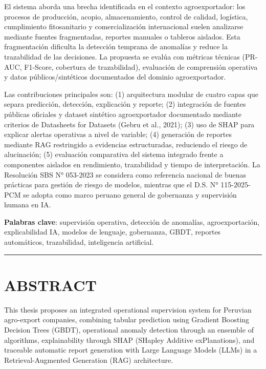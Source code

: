 El sistema aborda una brecha identificada en el contexto agroexportador:
los procesos de producción, acopio, almacenamiento, control de calidad,
logística, cumplimiento fitosanitario y comercialización internacional
suelen analizarse mediante fuentes fragmentadas, reportes manuales o
tableros aislados. Esta fragmentación dificulta la detección temprana de
anomalías y reduce la trazabilidad de las decisiones. La propuesta se
evalúa con métricas técnicas (PR-AUC, F1-Score, cobertura de
trazabilidad), evaluación de comprensión operativa y datos
públicos/sintéticos documentados del dominio agroexportador.

Las contribuciones principales son: (1) arquitectura modular de cuatro
capas que separa predicción, detección, explicación y reporte; (2)
integración de fuentes públicas oficiales y dataset sintético
agroexportador documentado mediante criterios de Datasheets for Datasets
(Gebru et al., 2021); (3) uso de SHAP para explicar alertas operativas a
nivel de variable; (4) generación de reportes mediante RAG restringido a
evidencias estructuradas, reduciendo el riesgo de alucinación; (5)
evaluación comparativa del sistema integrado frente a componentes
aislados en rendimiento, trazabilidad y tiempo de interpretación. La
Resolución SBS N° 053-2023 se considera como referencia nacional de
buenas prácticas para gestión de riesgo de modelos, mientras que el D.S.
N° 115-2025-PCM se adopta como marco peruano general de gobernanza y
supervisión humana en IA.

\textbf{Palabras clave}: supervisión operativa, detección de anomalías,
agroexportación, explicabilidad IA, modelos de lenguaje, gobernanza,
GBDT, reportes automáticos, trazabilidad, inteligencia artificial.

\begin{center}\rule{0.5\linewidth}{0.5pt}\end{center}

\section{ABSTRACT}\label{abstract}

This thesis proposes an integrated operational supervision system for
Peruvian agro-export companies, combining tabular prediction using
Gradient Boosting Decision Trees (GBDT), operational anomaly detection
through an ensemble of algorithms, explainability through SHAP (SHapley
Additive exPlanations), and traceable automatic report generation with
Large Language Models (LLMs) in a Retrieval-Augmented Generation (RAG)
architecture.

